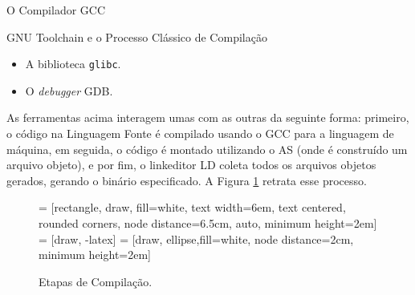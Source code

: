 \begin{section}{O Compilador GCC}
\begin{subsection}{GNU Toolchain e o Processo Clássico de Compilação}
\begin{itemize}
    \item A biblioteca \texttt{glibc}.

    \item O \textit{debugger} GDB.
\end{itemize}

As ferramentas acima interagem umas com as outras da seguinte forma: primeiro, o código na
Linguagem Fonte é compilado usando o GCC para a linguagem de máquina, em seguida, o código
é montado utilizando o AS (onde é construído um arquivo objeto), e por fim, o linkeditor
LD coleta todos os arquivos objetos gerados, gerando o binário especificado. A Figura
\ref{fig:gnu_toolchain} retrata esse processo.


\begin{figure}
 = [rectangle, draw, fill=white,
    text width=6em, text centered, rounded corners, node distance=6.5cm, auto, minimum height=2em]
 = [draw, -latex]
 = [draw, ellipse,fill=white, node distance=2cm,
    minimum height=2em]
\begin{center}
\end{center}
\caption{Etapas de Compilação.}
\label{fig:gnu_toolchain}
\end{figure}


\end{subsection}
\end{section}
